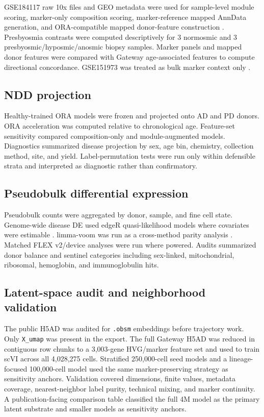 \documentclass[11pt]{article}
\begin{document}
GSE184117 raw 10x files and GEO metadata were used for sample-level module scoring, marker-only composition scoring, marker-reference mapped AnnData generation, and ORA-compatible mapped donor-feature construction \citep{oliva2022}. Presbyosmia contrasts were computed descriptively for 3 normosmic and 3 presbyosmic/hyposmic/anosmic biopsy samples. Marker panels and mapped donor features were compared with Gateway age-associated features to compute directional concordance. GSE151973 was treated as bulk marker context only \citep{fodoulian2020}.

\subsection{NDD projection}

Healthy-trained ORA models were frozen and projected onto AD and PD donors. ORA acceleration was computed relative to chronological age. Feature-set sensitivity compared composition-only and module-augmented models. Diagnostics summarized disease projection by sex, age bin, chemistry, collection method, site, and yield. Label-permutation tests were run only within defensible strata and interpreted as diagnostic rather than confirmatory.

\subsection{Pseudobulk differential expression}

Pseudobulk counts were aggregated by donor, sample, and fine cell state. Genome-wide disease DE used edgeR quasi-likelihood models where covariates were estimable \citep{edger2010}. limma-voom was run as a cross-method parity analysis \citep{voom2014,limma2015}. Matched FLEX v2/device analyses were run where powered. Audits summarized donor balance and sentinel categories including sex-linked, mitochondrial, ribosomal, hemoglobin, and immunoglobulin hits.

\subsection{Latent-space audit and neighborhood validation}

The public H5AD was audited for \texttt{.obsm} embeddings before trajectory work. Only \texttt{X\_umap} was present in the export. The full Gateway H5AD was reduced in contiguous row chunks to a 3,003-gene HVG/marker feature set and used to train scVI across all 4,028,275 cells. Stratified 250,000-cell seed models and a lineage-focused 100,000-cell model used the same marker-preserving strategy as sensitivity anchors. Validation covered dimensions, finite values, metadata coverage, nearest-neighbor label purity, technical mixing, and marker continuity. A publication-facing comparison table classified the full 4M model as the primary latent substrate and smaller models as sensitivity anchors.
\end{document}
